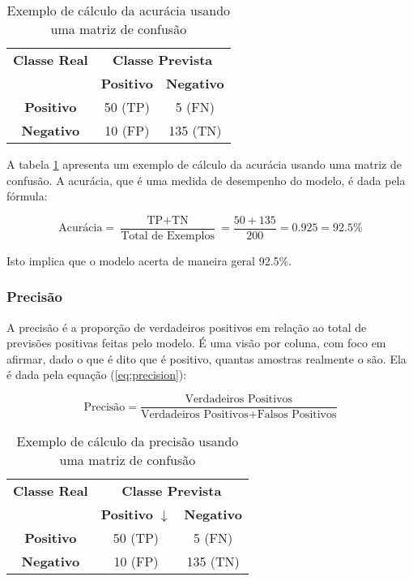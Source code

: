 \begin{table}[h]
\centering
\caption{Exemplo de cálculo da acurácia usando uma matriz de confusão}
\label{tab:exemplo_acuracia}
\begin{tabular}{c|cc}
\multicolumn{1}{c}{\textbf{Classe Real}} & \multicolumn{2}{c}{\textbf{Classe Prevista}} \\ \cline{2-3}
\multicolumn{1}{c}{} & \textbf{Positivo} & \textbf{Negativo} \\ \hline
\multicolumn{1}{c}{\textbf{Positivo}} & \cellcolor{green!25}50 (TP) & \cellcolor{red!25}5 (FN) \\
\multicolumn{1}{c}{\textbf{Negativo}} & \cellcolor{red!25}10 (FP) & \cellcolor{green!25}135 (TN) \\ \hline
\end{tabular}
\end{table}

A tabela \ref{tab:exemplo_acuracia} apresenta um exemplo de cálculo da acurácia usando uma matriz de confusão. A acurácia, que é uma medida de desempenho do modelo, é dada pela fórmula:

\[ \text{Acurácia} = \frac{\text{TP} + \text{TN}}{\text{Total de Exemplos}} = \frac{50 + 135}{200} = 0.925 = 92.5\%\]

Isto implica que o modelo acerta de maneira geral 92.5\%.

\subsubsection{Precisão}

A precisão é a proporção de verdadeiros positivos em relação ao total de previsões positivas feitas pelo modelo. É uma visão por coluna, com foco em afirmar, dado o que é dito que é positivo, quantas amostras realmente o são.  Ela é dada pela equação (\ref{eq:precision}):

\begin{equation}
\text{Precisão} = \frac{\text{Verdadeiros Positivos}}{\text{Verdadeiros Positivos} + \text{Falsos Positivos}} \label{eq:precision}
\end{equation}

\begin{table}[h]
\centering
\caption{Exemplo de cálculo da precisão usando uma matriz de confusão}
\label{tab:exemplo_precisao}
\begin{tabular}{c|cc}
\multicolumn{1}{c}{\textbf{Classe Real}} & \multicolumn{2}{c}{\textbf{Classe Prevista}} \\ \cline{2-3}
\multicolumn{1}{c}{} & \textbf{Positivo} $\downarrow$& \textbf{Negativo} \\ \hline
\multicolumn{1}{c}{\textbf{Positivo}} & \cellcolor{green!25}50 (TP) & \cellcolor{red!25}5 (FN) \\
\multicolumn{1}{c}{\textbf{Negativo}} & \cellcolor{red!25}10 (FP)  & \cellcolor{green!25}135 (TN) \\ \hline
\end{tabular}
\end{table}

